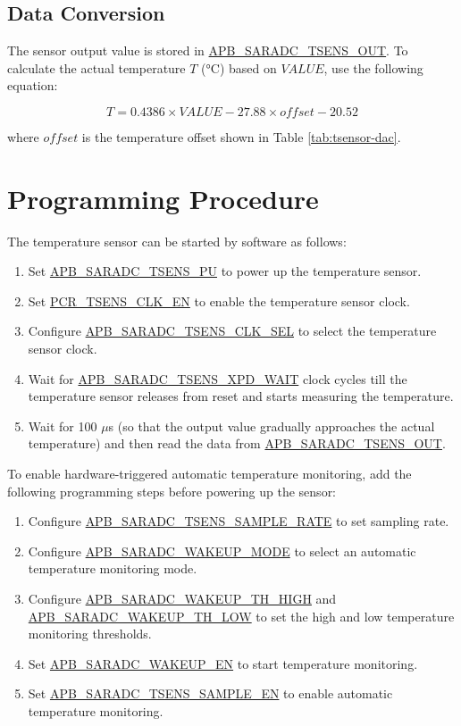 \documentclass[main\_\_EN.tex]{subfiles}
\begin{document}
\subsection{Data Conversion}

The sensor output value is stored in \hyperref[fielddesc:APBSARADCTSENSOUT]{APB\_SARADC\_TSENS\_OUT}. To calculate the actual temperature \(T\) (°C) based on \(VALUE\), use the following equation:

\[
        T = 0.4386 \times VALUE - 27.88 \times offset - 20.52
\]

where \(offset\) is the temperature offset shown in Table \ref{tab:tsensor-dac}.

\section{Programming Procedure}

The temperature sensor can be started by software as follows:
    \begin{enumerate}
        \item Set \hyperref[fielddesc:APBSARADCTSENSPU]{APB\_SARADC\_TSENS\_PU} to power up the temperature sensor.
        \item Set \hyperref[fielddesc:PCRTSENSCLKEN]{PCR\_TSENS\_CLK\_EN} to enable the temperature sensor clock.
        \item Configure \hyperref[fielddesc:APBSARADCTSENSCLKSEL]{APB\_SARADC\_TSENS\_CLK\_SEL} to select the temperature sensor clock.
        \item Wait for \hyperref[fielddesc:APBSARADCTSENSXPDWAIT]{APB\_SARADC\_TSENS\_XPD\_WAIT} clock cycles till the temperature sensor releases from reset and starts measuring the temperature.
        \item Wait for 100 $\mu$s (so that the output value gradually approaches the actual temperature) and then read the data from \hyperref[fielddesc:APBSARADCTSENSOUT]{APB\_SARADC\_TSENS\_OUT}.
    \end{enumerate}

To enable hardware-triggered automatic temperature monitoring, add the following programming steps before powering up the sensor:
    \begin{enumerate}
        \item Configure \hyperref[fielddesc:APBSARADCTSENSSAMPLERATE]{APB\_SARADC\_TSENS\_SAMPLE\_RATE} to set sampling rate.
        \item Configure \hyperref[fielddesc:APBSARADCWAKEUPMODE]{APB\_SARADC\_WAKEUP\_MODE} to select an automatic temperature monitoring mode.
        \item Configure \hyperref[fielddesc:APBSARADCWAKEUPTHHIGH]{APB\_SARADC\_WAKEUP\_TH\_HIGH} and \hyperref[fielddesc:APBSARADCWAKEUPTHLOW]{APB\_SARADC\_WAKEUP\_TH\_LOW} to set the high and low temperature monitoring thresholds.
        \item Set \hyperref[fielddesc:APBSARADCWAKEUPEN]{APB\_SARADC\_WAKEUP\_EN} to start temperature monitoring.
        \item Set \hyperref[fielddesc:APBSARADCTSENSSAMPLEEN]{APB\_SARADC\_TSENS\_SAMPLE\_EN} to enable automatic temperature monitoring.
    \end{enumerate}
\end{document}

